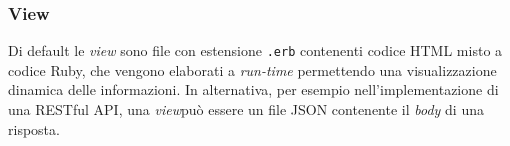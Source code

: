 \subsubsection{View}
Di default le \textit{view} sono file con estensione \texttt{.erb} contenenti codice HTML misto a codice Ruby, che vengono elaborati a \textit{run-time} permettendo una visualizzazione dinamica delle informazioni. In alternativa, per esempio nell'implementazione di una RESTful API, una \textit{view}può essere un file JSON contenente il \textit{body} di una risposta.